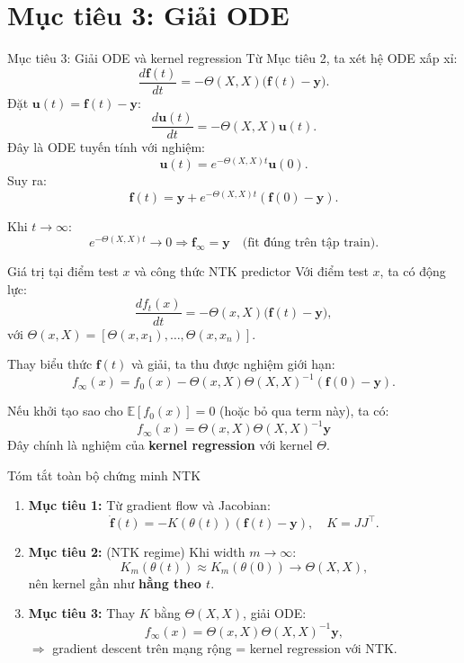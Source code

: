 \section{Mục tiêu 3: Giải ODE}
\begin{frame}{Mục tiêu 3: Giải ODE và kernel regression}
  Từ Mục tiêu 2, ta xét hệ ODE xấp xỉ:
  \[
    \frac{d\mathbf f(t)}{dt}
    = -\Theta(X,X)\big(\mathbf f(t) - \mathbf y\big).
  \]
  Đặt $\mathbf u(t) = \mathbf f(t) - \mathbf y$:
  \[
    \frac{d\mathbf u(t)}{dt}
    = -\Theta(X,X)\mathbf u(t).
  \]
  Đây là ODE tuyến tính với nghiệm:
  \[
    \mathbf u(t)
    = e^{-\Theta(X,X)t}\mathbf u(0).
  \]
  Suy ra:
  \[
    \mathbf f(t)
    = \mathbf y + e^{-\Theta(X,X)t}(\mathbf f(0) - \mathbf y).
  \]

  Khi $t \to \infty$:
  \[
    e^{-\Theta(X,X)t} \to 0
    \Rightarrow
    \mathbf f_\infty = \mathbf y
    \quad \text{(fit đúng trên tập train)}.
  \]
\end{frame}

\begin{frame}{Giá trị tại điểm test $x$ và công thức NTK predictor}
  Với điểm test $x$, ta có động lực:
  \[
    \frac{df_t(x)}{dt}
    = -\Theta(x,X)\big(\mathbf f(t) - \mathbf y\big),
  \]
  với
  \(
    \Theta(x,X) = [\Theta(x,x_1),\dots,\Theta(x,x_n)].
  \)

  Thay biểu thức $\mathbf f(t)$ và giải, ta thu được nghiệm giới hạn:
  \[
    f_\infty(x)
    = f_0(x) - \Theta(x,X)\Theta(X,X)^{-1}(\mathbf f(0) - \mathbf y).
  \]

  Nếu khởi tạo sao cho $\mathbb E[f_0(x)]=0$ (hoặc bỏ qua term này), ta có:
  \[
    \boxed{
    f_\infty(x)
    = \Theta(x,X)\Theta(X,X)^{-1}\mathbf y
    }
  \]
  Đây chính là nghiệm của \textbf{kernel regression} với kernel $\Theta$.
\end{frame}

\begin{frame}{Tóm tắt toàn bộ chứng minh NTK}
  \begin{enumerate}
    \item \textbf{Mục tiêu 1:}  
          Từ gradient flow và Jacobian:
          \[
            \dot{\mathbf f}(t)
            = -K(\theta(t))(\mathbf f(t)-\mathbf y),
            \quad K = JJ^\top.
          \]
    \item \textbf{Mục tiêu 2:} (NTK regime)  
          Khi width $m\to\infty$:
          \[
            K_m(\theta(t)) \approx K_m(\theta(0)) \to \Theta(X,X),
          \]
          nên kernel gần như \textbf{hằng theo $t$}.
    \item \textbf{Mục tiêu 3:}  
          Thay $K$ bằng $\Theta(X,X)$, giải ODE:
          \[
            f_\infty(x)
            = \Theta(x,X)\Theta(X,X)^{-1}\mathbf y,
          \]
          $\Rightarrow$ gradient descent trên mạng rộng = kernel regression với NTK.
  \end{enumerate}
\end{frame}
